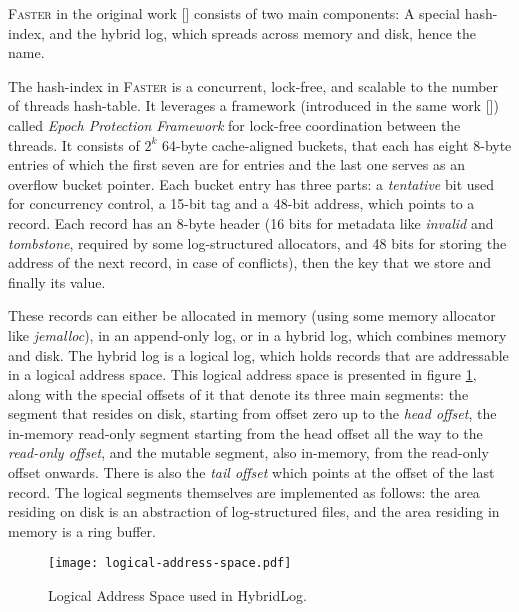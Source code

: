 \textsc{Faster} in the original work [\cite{faster}] consists of two main components: A special hash-index, and the hybrid log, which spreads across memory and disk, hence the name.

The hash-index in \textsc{Faster} is a concurrent, lock-free, and scalable to the number of threads hash-table. It leverages a framework (introduced in the same work [\cite{faster}]) called \textit{Epoch Protection Framework} for lock-free coordination between the threads. It consists of $2^k$ 64-byte cache-aligned buckets, that each has eight 8-byte entries of which the first seven are for entries and the last one serves as an overflow bucket pointer. Each bucket entry has three parts: a \textit{tentative} bit used for concurrency control, a 15-bit tag and a 48-bit address, which points to a record. Each record has an 8-byte header (16 bits for metadata like \textit{invalid} and \textit{tombstone}, required by some log-structured allocators, and 48 bits for storing the address of the next record, in case of conflicts), then the key that we store and finally its value.


These records can either be allocated in memory (using some memory allocator like \textit{jemalloc}), in an append-only log, or in a hybrid log, which combines memory and disk. The hybrid log is a logical log, which holds records that are addressable in a logical address space. This logical address space is presented in figure \ref{fig:logical-address-space}, along with the special offsets of it that denote its three main segments: the segment that resides on disk, starting from offset zero up to the \textit{head offset}, the in-memory read-only segment starting from the head offset all the way to the \textit{read-only offset}, and the mutable segment, also in-memory, from the read-only offset onwards. There is also the \textit{tail offset} which points at the offset of the last record.
The logical segments themselves are implemented as follows: the area residing on disk is an abstraction of log-structured files, and the area residing in memory is a ring buffer.

\vspace{20px}

\begin{figure}[h]
    \centering
    \texttt{[image: logical-address-space.pdf]}
    \caption{Logical Address Space used in HybridLog.}
    \label{fig:logical-address-space}
\end{figure}

